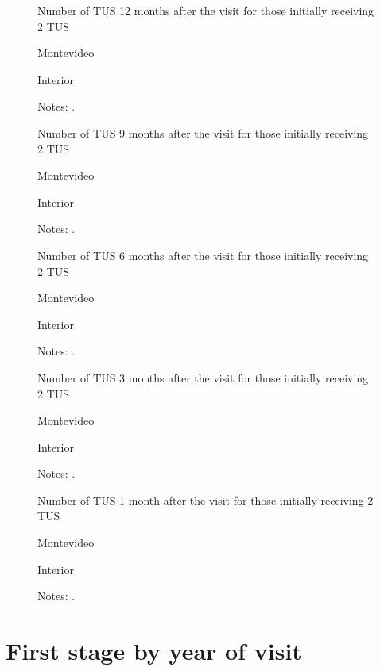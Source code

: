 \documentclass[12pt]{article}
\begin{document}
\begin{figure}[H]%
	\caption{Number of TUS 12 months after the visit for those initially receiving 2 TUS}%
	\centering
	\caption*{ {Montevideo}}
	\qquad
	\caption*{Interior}
	\label{fig:first_stage_si2Tus_tus12}%
	\caption*{ {\footnotesize Notes: .}}
\end{figure}

\begin{figure}[H]%
	\caption{Number of TUS 9 months after the visit for those initially receiving 2 TUS}%
	\centering
	\caption*{ {Montevideo}}
	\qquad
	\caption*{Interior}
	\label{fig:first_stage_si2Tus_tus9}%
	\caption*{ {\footnotesize Notes: .}}
\end{figure}

\begin{figure}[H]%
	\caption{Number of TUS 6 months after the visit for those initially receiving 2 TUS}%
	\centering
	\caption*{ {Montevideo}}
	\qquad
	\caption*{Interior}
	\label{fig:first_stage_si2Tus_tus6}%
	\caption*{ {\footnotesize Notes: .}}
\end{figure}

\begin{figure}[H]%
	\caption{Number of TUS 3 months after the visit for those initially receiving 2 TUS}%
	\centering
	\caption*{ {Montevideo}}
	\qquad
	\caption*{Interior}
	\label{fig:first_stage_si2Tus_tus3}%
	\caption*{ {\footnotesize Notes: .}}
\end{figure}

\begin{figure}[H]%
	\caption{Number of TUS 1 month after the visit for those initially receiving 2 TUS}%
	\centering
	\caption*{ {Montevideo}}
	\qquad
	\caption*{Interior}
	\label{fig:first_stage_si2Tus_tus1}%
	\caption*{ {\footnotesize Notes: .}}
\end{figure}

\section{First stage by year of visit}
\end{document}
